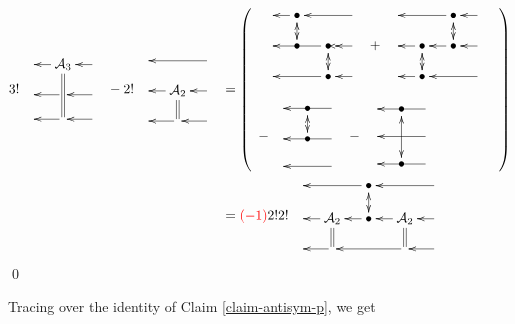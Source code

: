 \begin{align}
3!
\bcen
\xymatrix@R=1pc@C=1pc{
&\cala_3\ar@2{-}[dd]\ar[l]
&\ar[l]
\\
&\ar[l]
&\ar[l]
\\
&\ar[l]
&\ar[l]
}
\ecen
-
2!
\bcen
\xymatrix@R=1pc@C=1pc{
&
&\ar[ll]
\\
&\cala_2\ar@2{-}[d]\ar[l]
&\ar[l]
\\
&\ar[l]
&\ar[l]
}
\ecen
&=
\left(
\begin{array}{l}
\bcen
\xymatrix@R=1pc@C=1pc{
&\bullet\ar@{<->}[d]\ar[l]
&
&\ar[ll]
\\
&\bullet
&\bullet\ar[ll]
\ar\ar@{<->}[d]
&\ar[l]
\\
&
&\bullet\ar[ll]
&\ar[l]
}
\ecen
+
\bcen
\xymatrix@R=1pc@C=1pc{
&
&\bullet\ar@{<->}[d]\ar[ll]
&\ar[l]
\\
&\bullet\ar@{<->}[d]
\ar[l]
&\bullet\ar[l]
&\ar[l]
\\
&\bullet\ar[l]
&
&\ar[ll]
}
\ecen
\\
\\
-
\bcen
\xymatrix@R=1pc@C=1pc{
&\bullet\ar@{<->}[d]
&\ar[ll]
\\
&\bullet
&\ar[ll]
\\
&&\ar[ll]
}
\ecen
-
\bcen
\xymatrix@R=1pc@C=1pc{
&\bullet\ar@{<->}[dd]
&\ar[ll]
\\
&
&\ar[ll]
\\
&\bullet
&\ar[ll]
}
\ecen
\end{array}
\right)
\\
&=
{\color{red}(-1)}2! 2!
\bcen
\xymatrix@R=1pc@C=1pc{
&
&\bullet\ar[ll]\ar@{<->}[d]
&
&\ar[ll]
\\
&\cala_{2}\ar@2{-}[d]\ar[l]
&\bullet\ar[l]
&\cala_{2}\ar@2{-}[d]\ar[l]
&\ar[l]
\\
&\ar[l]
&&\ar[ll]
&\ar[l]
}
\ecen
\end{align}
\qed

Tracing over the identity
of Claim \ref{claim-antisym-p}, we get

